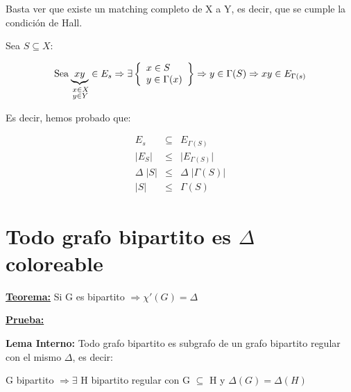\documentclass[12pt,a4paper]{report}
\begin{document}
	
		Basta ver que existe un matching completo de X a Y, es decir, que se cumple la condición de Hall.
		
		\vspace{5mm}
		Sea $S \subseteq X$:
		
		\begin{equation*}
			\text{Sea} 
			\underbrace{xy}_{\begin{subarray}{l} \; x \in X \\
	\; y \in Y \end{subarray}} \in E_{s} \Rightarrow
			{\Huge \exists}
  			\left\lbrace
  			\begin{array}{l}
    		 x \in S \\
     		 y \in \Gamma(x) \\
  			\end{array}
 			 \right\rbrace
 			 \Rightarrow y \in \Gamma(S) \Rightarrow xy \in E_{\Gamma(s)}
		\end{equation*}		
		
		\vspace{3mm}
		Es decir, hemos probado que:
		
		\begin{eqnarray}
			\nonumber E_{s} & \subseteq & E_{\Gamma(S)} \\
			\nonumber \lvert E_{S} \rvert &\leq & \lvert E_{\Gamma(S)} \rvert \\
			\nonumber \Delta \; \lvert S \rvert & \leq & \Delta \; \lvert \Gamma(S) \rvert \\
			\nonumber \lvert S \rvert & \leq & \Gamma(S)
		\end{eqnarray}
		
	\section{Todo grafo bipartito es $\Delta$ coloreable}
	
		\textbf{\underline{Teorema:}} Si G es bipartito $\Rightarrow \chi '(G) = \Delta $
	
		\textbf{\underline{Prueba:}} 
		
		\vspace{3mm}
		\textbf{Lema Interno:} Todo grafo bipartito es subgrafo de un grafo bipartito regular con el mismo $\Delta$, es decir:
		
		\begin{center}
			G bipartito $\Rightarrow \exists$ H bipartito regular con G $\subseteq$ H y $\Delta(G) = \Delta(H)$ 
		\end{center}
		
\end{document}
